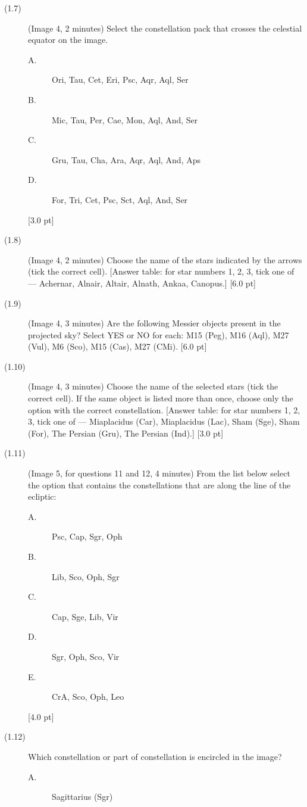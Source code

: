 \begin{description}
\item[(1.7)] (Image 4, 2 minutes) Select the constellation pack that crosses
  the celestial equator on the image.
  \begin{description}
  \item[A.] Ori, Tau, Cet, Eri, Psc, Aqr, Aql, Ser
  \item[B.] Mic, Tau, Per, Cae, Mon, Aql, And, Ser
  \item[C.] Gru, Tau, Cha, Ara, Aqr, Aql, And, Aps
  \item[D.] For, Tri, Cet, Psc, Sct, Aql, And, Ser
  \end{description}
  \hfill[3.0 pt]
\item[(1.8)] (Image 4, 2 minutes) Choose the name of the stars indicated by
  the arrows (tick the correct cell).
  [Answer table: for star numbers 1, 2, 3, tick one of --- Achernar,
  Alnair, Altair, Alnath, Ankaa, Canopus.] \hfill[6.0 pt]
\item[(1.9)] (Image 4, 3 minutes) Are the following Messier objects present
  in the projected sky? Select YES or NO for each:
  M15 (Peg), M16 (Aql), M27 (Vul), M6 (Sco), M15 (Cas), M27 (CMi).
  \hfill[6.0 pt]
\item[(1.10)] (Image 4, 3 minutes) Choose the name of the selected stars
  (tick the correct cell). If the same object is listed more than once,
  choose only the option with the correct constellation.
  [Answer table: for star numbers 1, 2, 3, tick one of --- Miaplacidus
  (Car), Miaplacidus (Lac), Sham (Sge), Sham (For), The Persian (Gru), The
  Persian (Ind).] \hfill[3.0 pt]
\item[(1.11)] (Image 5, for questions 11 and 12, 4 minutes) From the list
  below select the option that contains the constellations that are along
  the line of the ecliptic:
  \begin{description}
  \item[A.] Psc, Cap, Sgr, Oph
  \item[B.] Lib, Sco, Oph, Sgr
  \item[C.] Cap, Sge, Lib, Vir
  \item[D.] Sgr, Oph, Sco, Vir
  \item[E.] CrA, Sco, Oph, Leo
  \end{description}
  \hfill[4.0 pt]
\item[(1.12)] Which constellation or part of constellation is encircled in
  the image?
  \begin{description}
  \item[A.] Sagittarius (Sgr)

\end{description}
\end{description}
